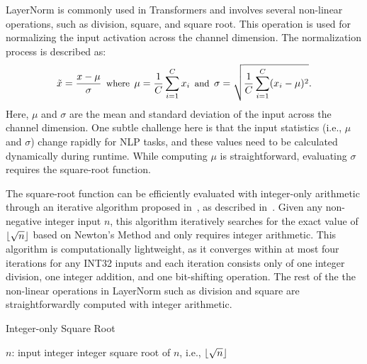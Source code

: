 LayerNorm is commonly used in Transformers and involves several non-linear operations, such as division, square, and square root. 
This operation is used for normalizing the input activation across the channel dimension.
The normalization process is described as:
\begin{equation}
\label{eqn:lnmusigma}
\small
    \tilde{x} = \frac{x - \mu}{\sigma}  \enspace \text{\upshape where} \enspace
    \mu   =  \frac{1}{C}\sum_{i=1}^C x_i 
    \enspace \text{\upshape and} \enspace 
    \sigma = \sqrt{\frac{1}{C}\sum_{i=1}^C (x_i - \mu)^2}  .
\end{equation} 
Here, $\mu$ and $\sigma$ are the mean and standard deviation of the input across the channel dimension.
One subtle challenge here is that the input statistics (i.e., $\mu$ and $\sigma$) change
rapidly for NLP tasks, and these values need to be 
calculated dynamically during runtime. While computing
$\mu$ is straightforward, evaluating $\sigma$ requires the square-root
function.

The square-root function can be efficiently evaluated with integer-only
arithmetic through an iterative algorithm proposed in~\cite{crandall2006prime}, as described in~.
Given any non-negative integer input $n$, this algorithm iteratively searches for the exact value of $\lfloor \sqrt{n} \rfloor$ based on Newton's Method and only requires integer arithmetic.
This algorithm is computationally lightweight, as it converges within at most
four iterations for any INT32 inputs and each iteration consists only of one integer division, one integer addition, and one bit-shifting operation. 
The rest of the the non-linear operations in LayerNorm such as division and square are straightforwardly computed with integer arithmetic. 


\begin{algorithm}[tb]
\caption{\footnotesize
Integer-only Square Root }
\label{alg:intsqrt}
\small
\begin{algorithmic}
 $n$: input integer 
 integer square root of $n$, i.e., $\lfloor \sqrt{n} \rfloor$
 
\vskip 0.075in
\ENDFUNCTION
\end{algorithmic}
\end{algorithm} 